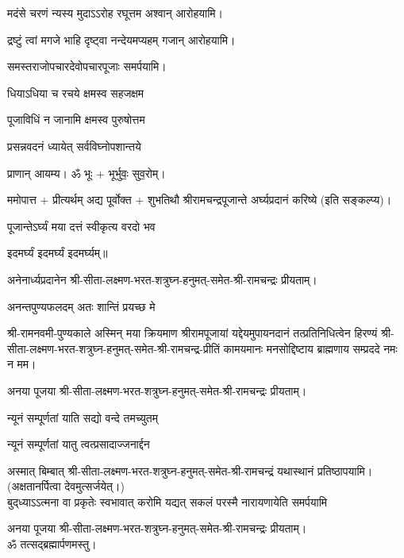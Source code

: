 {मदंसे चरणं न्यस्य मुदाऽऽरोह रघूत्तम}
\hfill अश्वान् आरोहयामि।


{द्रष्टुं त्वां मगजे भाहि दृष्ट्वा नन्देयमप्यहम्}
\hfill गजान् आरोहयामि।

समस्तराजोपचारदेवोपचारपूजाः समर्पयामि।



{धियाऽधिया च रचये क्षमस्व सहजक्षम}

{पूजाविधिं न जानामि क्षमस्व पुरुषोत्तम}



{प्रसन्नवदनं ध्यायेत् सर्वविघ्नोपशान्तये}


प्राणान्  आयम्य।  ॐ भूः + भूर्भुवः॒ सुव॒रोम्।

ममोपात्त + प्रीत्यर्थम् अद्य पूर्वोक्त + शुभतिथौ श्रीरामचन्द्रपूजान्ते अर्घ्यप्रदानं करिष्ये (इति सङ्कल्प्य)।

{पूजान्तेऽर्घ्यं मया दत्तं स्वीकृत्य वरदो भव}

\devAya{} इदमर्घ्यं इदमर्घ्यं इदमर्घ्यम्॥

अनेनार्ध्यप्रदानेन श्री-सीता-लक्ष्मण-भरत-शत्रुघ्न-हनुमत्-समेत-श्री-रामचन्द्रः प्रीयताम्।

{अनन्तपुण्यफलदम् अतः शान्तिं प्रयच्छ मे}

श्री-रामनवमी-पुण्यकाले अस्मिन् मया क्रियमाण श्रीरामपूजायां यद्देयमुपायनदानं तत्प्रतिनिधित्वेन हिरण्यं श्री-सीता-लक्ष्मण-भरत-शत्रुघ्न-हनुमत्-समेत-श्री-रामचन्द्र-प्रीतिं 
कामयमानः मनसोद्दिष्टाय ब्राह्मणाय सम्प्रददे नमः न मम। 

अनया पूजया श्री-सीता-लक्ष्मण-भरत-शत्रुघ्न-हनुमत्-समेत-श्री-रामचन्द्रः प्रीयताम्। 
 
{न्यूनं सम्पूर्णतां याति सद्यो वन्दे तमच्युतम्} 

{न्यूनं सम्पूर्णतां यातु त्वत्प्रसादाज्जनार्द्दन}

अस्मात् बिम्बात् श्री-सीता-लक्ष्मण-भरत-शत्रुघ्न-हनुमत्-समेत-श्री-रामचन्द्रं यथास्थानं प्रतिष्ठापयामि।\\
(अक्षतानर्पित्वा देवमुत्सर्जयेत्।)\\

{बुद्‌ध्याऽऽत्मना वा प्रकृतेः स्वभावात्}
{करोमि यद्यत् सकलं परस्मै}
{नारायणायेति समर्पयामि}

अनया पूजया श्री-सीता-लक्ष्मण-भरत-शत्रुघ्न-हनुमत्-समेत-श्री-रामचन्द्रः प्रीयताम्। \\
ॐ तत्सद्ब्रह्मार्पणमस्तु।

